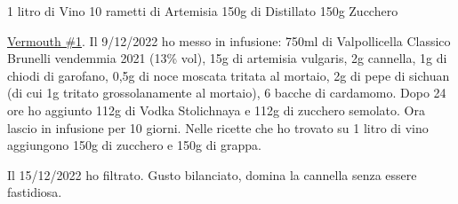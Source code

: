 \serves{-}%
\cooktime[]{-}%
\begin{ingreds}
	1 litro di Vino
	10 rametti di Artemisia
	150g di Distillato
	150g Zucchero



\end{ingreds}


\begin{method}
\underline{Vermouth \#1}. Il 9/12/2022 ho messo in infusione: 750ml di Valpollicella Classico Brunelli vendemmia 2021 (13\% vol), 15g di artemisia vulgaris, 2g cannella, 1g di chiodi di garofano, 0,5g di noce moscata tritata al mortaio, 2g di pepe di sichuan (di cui 1g tritato grossolanamente al mortaio), 6 bacche di cardamomo. Dopo 24 ore ho aggiunto 112g di Vodka Stolichnaya e 112g di zucchero semolato. Ora lascio in infusione per 10 giorni. Nelle ricette che ho trovato su 1 litro di vino aggiungono 150g di zucchero e 150g di grappa.

Il 15/12/2022 ho filtrato. Gusto bilanciato, domina la cannella senza essere fastidiosa.


\end{method}




